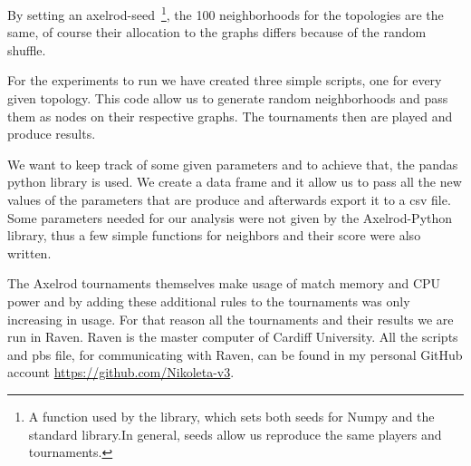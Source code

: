 By setting an axelrod-seed~\footnote{A function used by the library, which sets
both seeds for Numpy and the standard library.In general, seeds allow us
reproduce the same players and tournaments.}, the 100 neighborhoods for the
topologies are the same, of course their allocation to the graphs differs because
of the random shuffle.

For the experiments to run we have created three simple scripts, one for every
given topology. This code allow us to generate random
neighborhoods and pass them as nodes on their respective graphs. The tournaments
then are played and produce results.

We want to keep track of some given
parameters and to achieve that, the pandas python library is used. We create
a data frame and it allow us to pass all the new values of the parameters that
are produce and afterwards export it to a csv file. Some parameters needed for our
analysis were not given by the Axelrod-Python library, thus a few simple
functions for neighbors and their score were also written.

The Axelrod tournaments themselves make usage of match memory and CPU power and
by adding
these additional rules to the tournaments was only increasing in usage. For that
reason all the tournaments and their results we are run in Raven. Raven is the
master computer of Cardiff University. All the scripts and pbs file, for
communicating with Raven, can be found in my personal GitHub account
\url{https://github.com/Nikoleta-v3}.




